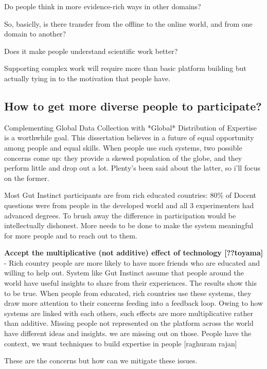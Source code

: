 Do people think in more evidence-rich ways in other domains?

So, basiclly, is there transfer from the offline to the online world, and from one domain to another?

Does it make people understand scientific work better?

Supporting complex work will require more than basic platform building but actually tying in to the motivation that people have.

\subsection{How to get more diverse people to participate?}

Complementing Global Data Collection with *Global* Distribution of Expertise is a worthwhile goal. This dissertation believes in a future of equal opportunity among people and equal skills. When people use such systems, two possible concerns come up: they provide a skewed population of the globe, and they perform little and drop out a lot. Plenty's been said about the latter, so i'll focus on the former.

Most Gut Instinct participants are from rich educated countries: 80\% of Docent questions were from people in the developed world and all 3 experimenters had advanced degrees. To brush away the difference in participation would be intellectually dishonest. More needs to be done to make the system meaningful for more people and to reach out to them. 

\textbf{Accept the multiplicative (not additive) effect of technology [??toyama]} - Rich country people are more likely to have more friends who are educated and willing to help out. System like Gut Instinct assume that people around the world have useful insights to share from their experiences. The results show this to be true. When people from educated, rich countries use these systems, they draw more attention to their concerns feeding into a feedback loop. Owing to how systems are linked with each others, such effects are more multiplicative rather than additive.  Missing people not represented on the platform across the world have different ideas and insights. we are missing out on those. People have the context, we want techniques to build expertise in people [raghuram rajan]

These are the concerns but how can we mitigate these issues.


